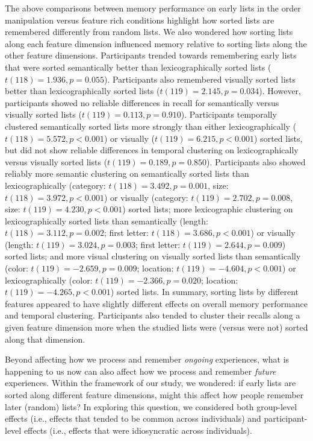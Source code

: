 \documentclass[11pt]{article}
\begin{document}
The above comparisons between memory performance on early lists in the order
manipulation versus feature rich conditions highlight how sorted lists are
remembered differently from random lists. We also wondered how sorting lists
along each feature dimension influenced memory relative to sorting lists along
the other feature dimensions. Participants trended towards remembering early
lists that were sorted semantically better than lexicographically sorted lists
($t(118) = 1.936, p = 0.055$). Participants also remembered visually sorted
lists better than lexicographically sorted lists ($t(119) = 2.145, p = 0.034$).
However, participants showed no reliable differences in recall for semantically
versus visually sorted lists ($t(119) = 0.113, p = 0.910$). Participants
temporally clustered semantically sorted lists more strongly than either
lexicographically ($t(118) = 5.572, p < 0.001$) or visually ($t(119) = 6.215, p
< 0.001$) sorted lists, but did not show reliable differences in temporal
clustering on lexicographically versus visually sorted lists ($t(119) = 0.189,
p = 0.850$). Participants also showed reliably more semantic clustering on
semantically sorted lists than lexicographically (category: $t(118) = 3.492, p
= 0.001$, size: $t(118) = 3.972, p < 0.001$) or visually (category: $t(119) =
2.702, p = 0.008$, size: $t(119) = 4.230, p < 0.001$) sorted lists; more
lexicographic clustering on lexicographically sorted lists than semantically
(length: $t(118) = 3.112, p = 0.002$; first letter: $t(118) = 3.686, p <
0.001$) or visually (length: $t(119) = 3.024, p = 0.003$; first letter: $t(119)
= 2.644, p = 0.009$) sorted lists; and more visual clustering on visually
sorted lists than semantically (color: $t(119) = -2.659, p = 0.009$; location:
$t(119) = -4.604, p < 0.001$) or lexicographically (color: $t(119) = -2.366, p
= 0.020$; location: $t(119) = -4.265, p < 0.001$) sorted lists. In summary,
sorting lists by different features appeared to have slightly different effects
on overall memory performance and temporal clustering.  Participants also tended to
cluster their recalls along a given feature dimension more when the studied
lists were (versus were not) sorted along that dimension.

Beyond affecting how we process and remember \textit{ongoing} experiences, what
is happening to us now can also affect how we process and remember
\textit{future} experiences. Within the framework of our study, we wondered: if
early lists are sorted along different feature dimensions, might this affect
how people remember later (random) lists? In exploring this question, we
considered both group-level effects (i.e., effects that tended to be common
across individuals) and participant-level effects (i.e., effects that were
idiosyncratic across individuals).
\end{document}
